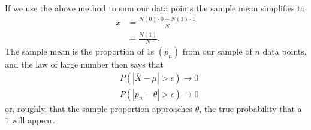 \begin{VT1}
If we use the above method to sum our data points the sample mean simplifies to  
\begin{align}
    \overline{x} &= \frac{ N(0) \cdot 0 + N(1) \cdot 1  }{N} \\ 
                 &= \frac{N(1)}{N}.
\end{align}
The sample mean is the proportion of 1s $(p_{n})$ from our sample of $n$ data points, and the law of large number then says that 
\begin{align}
    &P( | \overline{X} - \mu | > \epsilon ) \to 0 \\ 
    &P( | p_{n} - \theta | > \epsilon ) \to 0
\end{align}
or, roughly, that the sample proportion approaches $\theta$, the true probability that a $1$ will appear.

\end{VT1}


